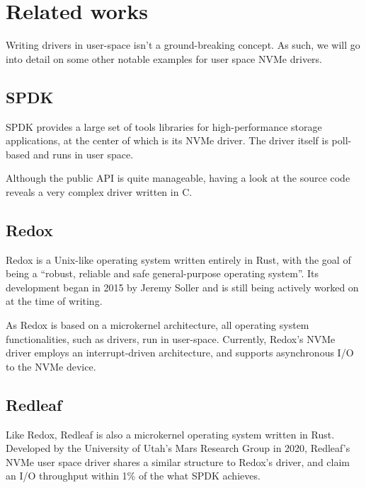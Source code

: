\chapter{Related works}
Writing drivers in user-space isn't a ground-breaking concept. As such, we will go into detail on some other notable examples for user space NVMe drivers.

\section{SPDK}
SPDK provides a large set of tools libraries for high-performance storage applications, at the center of which is its NVMe driver. The driver itself is poll-based and runs in user space.

Although the public API is quite manageable, having a look at the source code reveals a very complex driver written in C.

\section{Redox}
Redox is a Unix-like operating system written entirely in Rust, with the goal of being a ``robust, reliable and safe general-purpose operating system''. Its development began in 2015 by Jeremy Soller and is still being actively worked on at the time of writing.

As Redox is based on a microkernel architecture, all operating system functionalities, such as drivers, run in user-space. Currently, Redox's NVMe driver employs an interrupt-driven architecture, and supports asynchronous I/O to the NVMe device.

\section{Redleaf}
Like Redox, Redleaf is also a microkernel operating system written in Rust. Developed by the University of Utah's Mars Research Group in 2020, Redleaf's NVMe user space driver shares a similar structure to Redox's driver, and claim an I/O throughput within 1\% of the what SPDK achieves.
